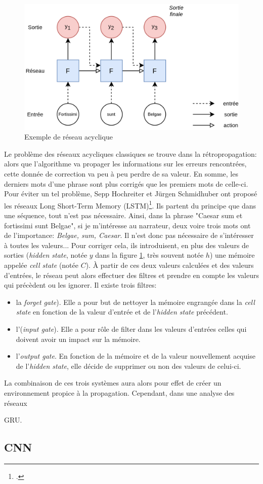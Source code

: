 \begin{figure}
    \centering
    \includegraphics[width=\linewidth]{results/deep-learning/explanations/RNN.png}
    \caption{Exemple de réseau acyclique}
    \label{fig:deep-learning:rnn}
\end{figure}

Le problème des réseaux acycliques classiques se trouve dans la rétropropagation: alors que l'algorithme va propager les informations sur les erreurs rencontrées, cette donnée de correction va peu à peu perdre de sa valeur. En somme, les derniers mots d'une phrase sont plus corrigés que les premiers mots de celle-ci. Pour éviter un tel problème, Sepp Hochreiter et Jürgen Schmidhuber ont proposé les réseaux Long Short-Term Memory (LSTM)\footcite{hochreiter_long_1997}. Ils partent du principe que dans une séquence, tout n'est pas nécessaire. Ainsi, dans la phrase "Caesar sum et fortissimi sunt Belgae", si je m'intéresse au narrateur, deux voire trois mots ont de l'importance: \textit{Belgae, sum, Caesar}. Il n'est donc pas nécessaire de s'intéresser à toutes les valeurs... Pour corriger cela, ils introduisent, en plus des valeurs de sorties (\textit{hidden state}, notée $y$ dans la figure \ref{fig:deep-learning:rnn}, très souvent notée $h$) une mémoire appelée \textit{cell state} (notée $C$). À partir de ces deux valeurs calculées et des valeurs d'entrées, le réseau peut alors effectuer des filtres et prendre en compte les valeurs qui précèdent ou les ignorer. Il existe trois filtres:
\begin{itemize}
    \item la \textit{forget gate}). Elle a pour but de nettoyer la mémoire engrangée dans la \textit{cell state} en fonction de la valeur d'entrée et de l'\textit{hidden state} précédent. 
    \item l'(\textit{input gate}). Elle a pour rôle de filter dans les valeurs d'entrées celles qui doivent avoir un impact sur la mémoire.
    \item l'\textit{output gate}. En fonction de la mémoire et de la valeur nouvellement acquise de l'\textit{hidden state}, elle décide de supprimer ou non des valeurs de celui-ci.
\end{itemize}
La combinaison de ces trois systèmes aura alors pour effet de créer un environnement propice à la propagation. Cependant, dans une analyse des réseaux %

GRU.


\subsection{CNN}